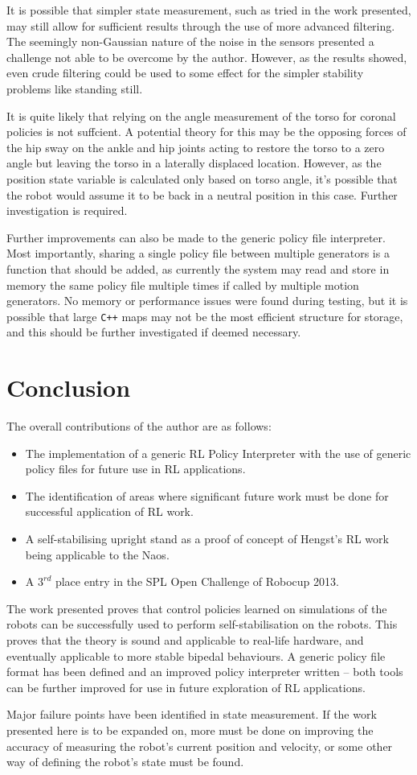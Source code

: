 It is possible that simpler state measurement, such as tried in the work presented, may still allow for sufficient results through the use of more advanced filtering. The seemingly non-Gaussian nature of the noise in the sensors presented a challenge not able to be overcome by the author. However, as the results showed, even crude filtering could be used to some effect for the simpler stability problems like standing still.

It is quite likely that relying on the angle measurement of the torso for coronal policies is not suffcient. A potential theory for this may be the opposing forces of the hip sway on the ankle and hip joints acting to restore the torso to a zero angle but leaving the torso in a laterally displaced location. However, as the position state variable is calculated only based on torso angle, it's possible that the robot would assume it to be back in a neutral position in this case. Further investigation is required.

Further improvements can also be made to the generic policy file interpreter. Most importantly, sharing a single policy file between multiple generators is a function that should be added, as currently the system may read and store in memory the same policy file multiple times if called by multiple motion generators. No memory or performance issues were found during testing, but it is possible that large \verb!C++! maps may not be the most efficient structure for storage, and this should be further investigated if deemed necessary.

\section{Conclusion}
The overall contributions of the author are as follows:
\begin{itemize}
\item The implementation of a generic RL Policy Interpreter with the use of generic policy files for future use in RL applications.
\item The identification of areas where significant future work must be done for successful application of RL work.
\item A self-stabilising upright stand as a proof of concept of Hengst's RL work being applicable to the Naos.
\item A $3^{rd}$ place entry in the SPL Open Challenge of Robocup 2013.
\end{itemize}

The work presented proves that control policies learned on simulations of the robots can be successfully used to perform self-stabilisation on the robots. This proves that the theory is sound and applicable to real-life hardware, and eventually applicable to more stable bipedal behaviours. A generic policy file format has been defined and an improved policy interpreter written -- both tools can be further improved for use in future exploration of RL applications.

Major failure points have been identified in state measurement. If the work presented here is to be expanded on, more must be done on improving the accuracy of measuring the robot's current position and velocity, or some other way of defining the robot's state must be found.
